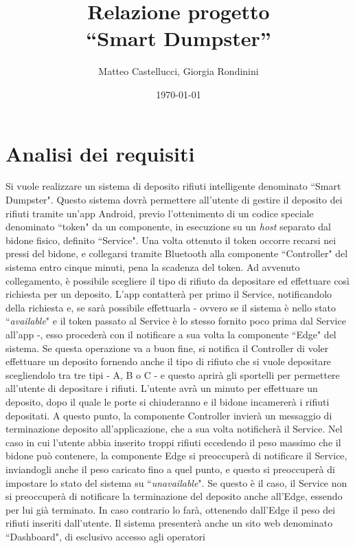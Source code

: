 \documentclass[a4paper, 12pt]{report}
\title{Relazione progetto\\``Smart Dumpster''}
\author{Matteo Castellucci, Giorgia Rondinini}
\date{\today}
\begin{document}
	\maketitle
	\tableofcontents
	\chapter{Analisi dei requisiti}
	Si vuole realizzare un sistema di deposito rifiuti intelligente denominato ``Smart Dumpster".\newline
	Questo sistema dovrà permettere all'utente di gestire il deposito dei rifiuti tramite un'app Android,
	previo l'ottenimento di un codice speciale denominato ``token" da un componente, in esecuzione su un
	\textit{host} separato dal bidone fisico, definito ``Service". Una volta ottenuto il token occorre
	recarsi nei pressi del bidone, e collegarsi tramite Bluetooth alla componente ``Controller" del
	sistema entro cinque minuti, pena la scadenza del token. Ad avvenuto collegamento, è
	possibile scegliere il tipo di rifiuto da depositare ed
	effettuare così richiesta per un deposito. L'app contatterà per primo il Service, notificandolo della
	richiesta e, se sarà possibile effettuarla - ovvero se il sistema è nello stato ``\textit{available}"
	e il token passato al Service è lo stesso fornito poco prima dal Service all'app -, esso procederà
	con il notificare a sua volta la componente ``Edge" del sistema. Se questa operazione va a buon fine, 
	si notifica il Controller di voler effettuare un deposito fornendo anche il tipo di rifiuto che si
	vuole depositare scegliendolo tra tre tipi - A, B o C - e questo aprirà gli sportelli per permettere
	all'utente di depositare i rifiuti. L'utente
	avrà un minuto per effettuare un deposito, dopo il quale le porte si chiuderanno e il bidone
	incamererà i rifiuti depositati. A questo punto, la componente Controller invierà un messaggio di
	terminazione deposito all'applicazione, che a sua volta notificherà il Service. Nel caso in cui
	l'utente abbia inserito troppi rifiuti eccedendo il peso massimo che il bidone può contenere, la
	componente Edge si preoccuperà di notificare il Service, inviandogli anche il peso caricato fino a
	quel punto, e questo si preoccuperà di impostare lo stato del sistema su ``\textit{unavailable}". Se questo è
	il caso, il Service non si preoccuperà di notificare la terminazione del deposito anche all'Edge,
	essendo per lui già terminato. In caso contrario lo farà, ottenendo dall'Edge il peso dei rifiuti
	inseriti dall'utente.\newline
	Il sistema presenterà anche un sito web denominato ``Dashboard", di esclusivo accesso agli operatori
\end{document}
